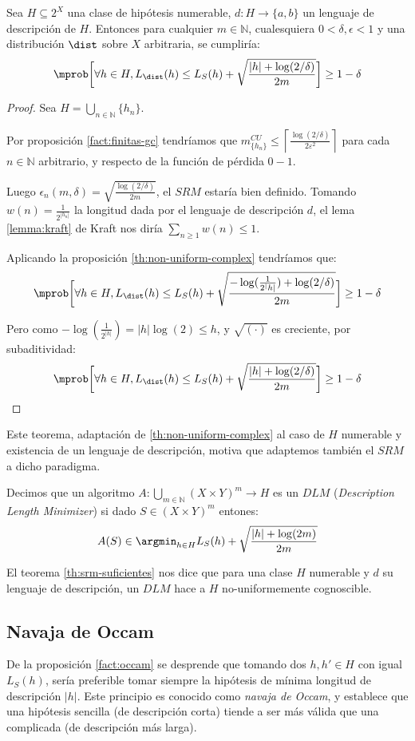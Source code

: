 \begin{fact}
 Sea $H \subseteq 2^X$ una clase de hipótesis numerable, $d:H \rightarrow \{a,b\}$ un lenguaje de descripción de $H$. Entonces
 para cualquier $m\in \mathbb{N}$, cualesquiera $0 < \delta, \epsilon < 1$ y una distribución $\dist$ sobre $X$ arbitraria, 
 se cumpliría:
 \[
   \mprob\bigg[\forall h\in H, L_{\dist}(h) \le L_S(h) + \sqrt{\frac{|h| + \log(2/\delta)}{2m}} \bigg] \ge 1 - \delta
 \] 
 \label{fact:occam}
\end{fact}
\begin{proof}
 Sea $H = \bigcup_{n\in \mathbb{N}} \{h_n\}$. 
 
 Por proposición \ref{fact:finitas-gc} tendríamos que $m^{CU}_{\{h_n\}} \le \left\lceil \frac{\log(2/\delta)}{2\varepsilon^2} \right\rceil$
 para cada $n\in \mathbb{N}$ arbitrario, y respecto de la función de pérdida $0-1$.
 
 Luego $\epsilon_n(m,\delta) = \sqrt{\frac{\log(2/\delta)}{2m}}$, el $SRM$ estaría bien definido. Tomando $w(n) = \frac{1}{2^|h_n|}$ la longitud
 dada por el lenguaje de descripción $d$, el lema \ref{lemma:kraft} de Kraft nos diría $\sum_{n \ge 1} w(n) \le 1$.
 
 Aplicando la proposición \ref{th:non-uniform-complex} tendríamos que:
 \[
   \mprob\bigg[\forall h\in H, L_{\dist}(h) \le L_S(h) + \sqrt{\frac{-\log(\frac{1}{2^|h|}) + \log(2/\delta)}{2m}} \bigg] \ge 1 - \delta
 \]
 
 Pero como $-\log(\frac{1}{2^|h|}) = |h|\log(2) \le h$, y $\sqrt{(\cdot)}$ es creciente, por subaditividad:
 \[
   \mprob\bigg[\forall h\in H, L_{\dist}(h) \le L_S(h) + \sqrt{\frac{|h| + \log(2/\delta)}{2m}} \bigg] \ge 1 - \delta
 \]
\end{proof}

Este teorema, adaptación de \ref{th:non-uniform-complex} al caso de $H$ numerable y existencia de un lenguaje de descripción,
motiva que adaptemos también el $SRM$ a dicho paradigma.

\begin{definition}
Decimos que un algoritmo $A: \underset{m\in \mathbb{N}}{\bigcup} (X\times Y)^m \rightarrow H$ es un $DLM$ 
(\textit{Description Length Minimizer}) si dado $S \in (X\times Y)^m$ entones:
\[
  A(S) \in \argmin_{h\in H} L_S(h) + \sqrt{\frac{|h| + \log(2m)}{2m}} 
\]
\end{definition}

El teorema \ref{th:srm-suficientes} nos dice que para una clase $H$ numerable y $d$ su lenguaje de descripción, un $DLM$
hace a $H$ no-uniformemente cognoscible.

\subsection{Navaja de Occam}
De la proposición \ref{fact:occam} se desprende que tomando dos $h, h' \in H$ con igual $L_S(h)$, sería preferible tomar siempre
la hipótesis de mínima longitud de descripción $|h|$. Este principio es conocido como \textit{navaja de Occam}, y establece
que una hipótesis sencilla (de descripción corta) tiende a ser más válida que una complicada (de descripción más larga).
